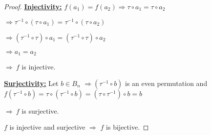 \documentclass{article}
\begin{document}
\begin{proof}
  \noindent
  \textbf{\underline{Injectivity:}}
  $f(a_1) = f(a_2) \Rightarrow \tau \circ a_1 = \tau \circ a_2$
  
  \noindent
  $\Rightarrow \tau^{-1} \circ (\tau \circ a_1) = \tau^{-1} \circ (\tau \circ a_2)$ 

  \noindent
  $\Rightarrow (\tau^{-1} \circ \tau )\circ a_1 = (\tau^{-1} \circ \tau) \circ a_2$ 
  
  \noindent
  $\Rightarrow a_1 = a_2$
  
  \noindent
  $\Rightarrow \ f$ is injective.
  \newline

  \noindent
  \textbf{\underline{Surjectivity:}}
  Let $b \in B_n$ $\Rightarrow (\tau^{-1} \circ b)$ is an even permutation and $f(\tau^{-1} \circ b) = \tau \circ (\tau^{-1} \circ b)= (\tau \circ \tau^{-1}) \circ b = b$
  
  \noindent
  $\Rightarrow \ f$ is surjective.
  \newline

  \noindent
  $f$ is injective and surjective $\Rightarrow$ $f$ is bijective.
\end{proof}
\end{document}
